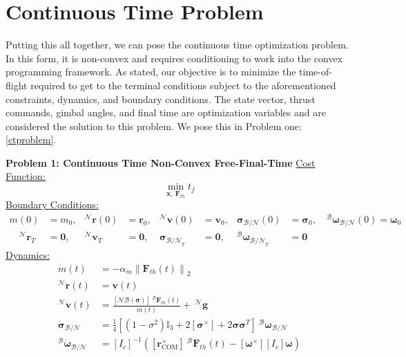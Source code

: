 \section{Continuous Time Problem}
Putting this all together, we can pose the continuous time optimization problem. In this form, it is non-convex and requires conditioning to work into the convex programming framework. As stated, our objective is to minimize the time-of-flight required to get to the terminal conditions subject to the aforementioned constraints, dynamics, and boundary conditions. The state vector, thrust commands, gimbal angles, and final time are optimization variables and are considered the solution to this problem. We pose this in Problem one: \ref{ctproblem}.
%
\clearpage
\begin{mdframed}
\label{ctproblem}
\textbf{Problem 1: Continuous Time Non-Convex Free-Final-Time}
\newline
\underline{Cost Function:}
\begin{equation*}
\min_{\mathbf{x}, \ \mathbf{F}_{th}} t_f
\end{equation*}
%
\underline{Boundary Conditions:}  
\begin{align*}
m(0) &= m_0, &^\mathcal{N}\mathbf{r}(0) &= \mathbf{r}_0, & ^\mathcal{N}\mathbf{v}(0) &= \mathbf{v}_0, & \boldsymbol{\sigma}_\mathcal{B/N}(0) &= \boldsymbol{\sigma}_0, \quad ^\mathcal{B}\boldsymbol{\omega}_\mathcal{B/N}(0) = \boldsymbol{\omega}_0 \\
\quad ^\mathcal{N}\mathbf{r}_{T} &= \mathbf{0}, & ^\mathcal{N}\mathbf{v}_T &= \mathbf{0}, & \boldsymbol{\sigma}_{\mathcal{B/N}_T} &= \mathbf{0}, & ^\mathcal{B}\boldsymbol{\omega}_{\mathcal{B/N}_{T}} &= \mathbf{0}
\end{align*}
%
\underline{Dynamics:}  
\begin{align*}
\dot{m}(t) &= -\alpha_{\dot{m}} \left\lVert \mathbf{F}_{th}(t) \right\rVert _2 \\
^\mathcal{N}\dot{\mathbf{r}}(t) &= \mathbf{v}(t) \\
^\mathcal{N}\dot{\mathbf{v}}(t) &= \frac{[\mathcal{NB}(\boldsymbol{\sigma})] \ ^\mathcal{B}\mathbf{F}_{th}(t)}{m(t)} +  \ ^\mathcal{N}\mathbf{g} \\
\dot{\boldsymbol{\sigma}}_\mathcal{B/N} &= \frac{1}{4} \left [(1-\sigma^2)\mathbb{I}_3 +  2[\boldsymbol{\sigma}^\times] + 2\boldsymbol{\sigma}\boldsymbol{\sigma}^T \right ] \ ^\mathcal{B}\boldsymbol{\omega}_\mathcal{B/N} \\
^\mathcal{B}\dot{\boldsymbol{\omega}}_\mathcal{B/N} &= [I_c]^{-1}\left([\boldsymbol{r}_{\text{COM}}^\times] \ ^\mathcal{B}\mathbf{F}_{th}(t) - [\boldsymbol{\omega}^\times][I_c]\boldsymbol{\omega}\right)

\end{align*}
\end{mdframed}
